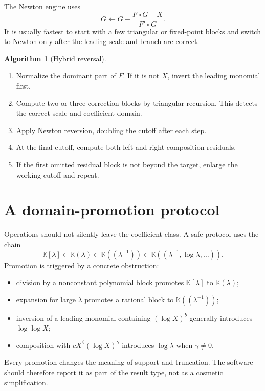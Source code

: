 \documentclass[11pt,openany]{book}
\theoremstyle{definition}
\newtheorem{algorithm}{Algorithm}[chapter]
\theoremstyle{plain}
\theoremstyle{remark}
\newcommand{\K}{\mathbb{K}}
\begin{document}
The Newton engine uses
\begin{equation}\label{eq:implementation-newton-reversion}
 G\leftarrow G-\frac{F\circ G-X}{F'\circ G}.
\end{equation}
It is usually fastest to start with a few triangular or fixed-point blocks and switch to Newton only after the leading scale and branch are correct.

\begin{algorithm}[Hybrid reversal]\label{alg:hybrid-reversal}
\begin{enumerate}
\item Normalize the dominant part of \(F\). If it is not \(X\), invert the leading monomial first.
\item Compute two or three correction blocks by triangular recursion. This detects the correct scale and coefficient domain.
\item Apply Newton reversion, doubling the cutoff after each step.
\item At the final cutoff, compute both left and right composition residuals.
\item If the first omitted residual block is not beyond the target, enlarge the working cutoff and repeat.
\end{enumerate}
\end{algorithm}


\section{A domain-promotion protocol}
Operations should not silently leave the coefficient class. A safe protocol uses the chain
\[
 \K[\lambda]
 \subset \K(\lambda)
 \subset \K((\lambda^{-1}))
 \subset \K((\lambda^{-1},\log\lambda,\ldots)).
\]
Promotion is triggered by a concrete obstruction:
\begin{itemize}
\item division by a nonconstant polynomial block promotes \(\K[\lambda]\) to \(\K(\lambda)\);
\item expansion for large \(\lambda\) promotes a rational block to \(\K((\lambda^{-1}))\);
\item inversion of a leading monomial containing \((\log X)^b\) generally introduces \(\log\log X\);
\item composition with \(cX^\beta(\log X)^\gamma\) introduces \(\log\lambda\) when \(\gamma\ne0\).
\end{itemize}
Every promotion changes the meaning of support and truncation. The software should therefore report it as part of the result type, not as a cosmetic simplification.
\end{document}
